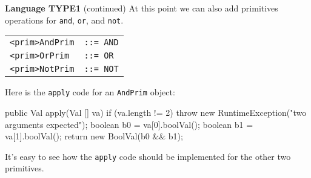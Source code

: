\begin{minipage}[t]{\sw}
\slidenumber
\LARGE
{\bf Language TYPE1} (continued)\exx
\Large
At this point we can also add primitives operations
for \verb'and', \verb'or', and \verb'not'.\exx
\emm\begin{tabular}{ll}
\verb'<prim>AndPrim' & \verb'::= AND'\\
\verb'<prim>OrPrim' & \verb'::= OR'\\
\verb'<prim>NotPrim' & \verb'::= NOT'\\
\end{tabular}\exx
Here is the \verb'apply' code for an \verb'AndPrim' object:
\begin{qv}
public Val apply(Val [] va) {
    if (va.length != 2)
        throw new RuntimeException("two arguments expected");
    boolean b0 = va[0].boolVal();
    boolean b1 = va[1].boolVal();
    return new BoolVal(b0 && b1);
}
\end{qv}
It's easy to see how the \verb'apply' code should be implemented
for the other two primitives.
\end{minipage}
